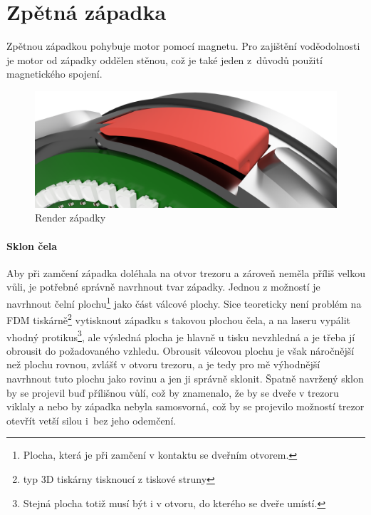 \section{Zpětná západka}

Zpětnou západkou pohybuje motor pomocí magnetu. Pro zajištění vodě\-o\-dol\-nos\-ti je motor od západky oddělen stěnou, což je také jeden z~důvodů použití magne\-tic\-ké\-ho spojení.

\begin{figure}[h]
    \centering
    \includegraphics[width=\textwidth]{kapitoly/obrazky/E4/zapadka/render.png}
    \caption{Render západky}

    \label{fig:E4-zapadka}
\end{figure}

\paragraph{Sklon čela}

Aby při zamčení západka doléhala na otvor trezoru a zároveň neměla příliš velkou vůli, je potřebné správně navrhnout tvar západky.
Jednou z možností je navrhnout čelní plochu\footnote{Plocha, která je při zamčení v kontaktu se dveřním otvorem.} jako část válcové plochy. 
Sice teoreticky není problém na FDM tiskárně\footnote{typ 3D tiskárny tisknoucí z tiskové struny} vytisknout západku s takovou plochou čela,  %
a na laseru vypálit vhodný protikus\footnote{Stejná plocha totiž musí být i v otvoru, do kterého se dveře umístí.},
ale výsledná plocha je hlavně u tisku nevzhledná a je třeba jí obrousit do požadovaného vzhledu. Obrousit válcovou plochu je však náročnější než plochu rovnou, zvlášť v otvoru trezoru, 
a je tedy pro mě výhodnější navrhnout tuto plochu jako rovinu a jen ji správně sklonit. Špatně navržený sklon by se projevil buď přílišnou vůlí, 
což by znamenalo, že by se dveře v trezoru viklaly a nebo by západka nebyla samosvorná, což by se projevilo možností trezor otevřít vetší silou 
i~bez jeho odemčení.

